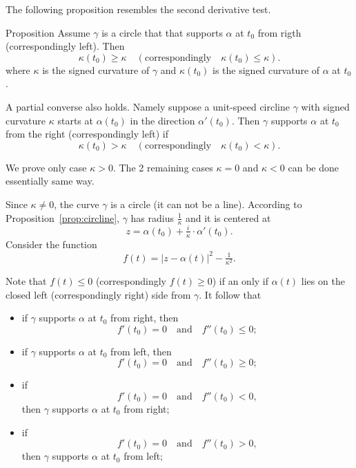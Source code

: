The following proposition resembles the second derivative test. 

\begin{thm}{Proposition}\label{prop:supporting-circline}
Assume $\gamma$ is a circle that that supports $\alpha$ at $t_0$ from rigth (correspondingly left).  
Then 
\[\kappa(t_0)\ge \kappa
\quad(\text{correspondingly}\quad\kappa(t_0)\le \kappa).
\] 
where $\kappa$ is the signed curvature of $\gamma$ 
and $\kappa(t_0)$ is the signed curvature of $\alpha$ at $t_0$.

A partial converse also holds.
Namely suppose a unit-speed circline $\gamma$ with signed curvature $\kappa$ starts at $\alpha(t_0)$ in the direction $\alpha'(t_0)$.
Then $\gamma$ supports $\alpha$ at $t_0$ from the right (correspondingly left) if 
\[\kappa(t_0)> \kappa
\quad(\text{correspondingly}\quad\kappa(t_0)< \kappa).
\]

\end{thm}

We prove only case $\kappa>0$.
The 2 remaining cases $\kappa=0$ and $\kappa<0$ can be done essentially same way.

Since $\kappa\ne0$, the curve $\gamma$ is a circle (it can not be a line).
According to Proposition~\ref{prop:circline},
$\gamma$ has radius $\tfrac1\kappa$ and it is centered at 
\[z=\alpha(t_0)+\tfrac i\kappa\cdot \alpha'(t_0).\]
Consider the function 
\[f(t)=|z-\alpha(t)|^2-\tfrac1{\kappa^2}.\]

Note that $f(t)\le0$ (correspondingly $f(t)\ge0$) 
if an only if $\alpha(t)$ lies on the closed left (correspondingly right) side from $\gamma$.
It follow that 
\begin{itemize}
\item if $\gamma$ supports $\alpha$ at $t_0$ from right, 
then
\[f'(t_0)=0\quad\text{and}\quad f''(t_0)\le 0;\]

\item if $\gamma$ supports $\alpha$ at $t_0$ from  left, 
then 
\[f'(t_0)=0\quad\text{and}\quad f''(t_0)\ge 0;\]

\item if 
\[f'(t_0)=0\quad\text{and}\quad f''(t_0)< 0,\]
then $\gamma$ supports $\alpha$ at $t_0$ from  right;

\item if 
\[f'(t_0)=0\quad\text{and}\quad f''(t_0)> 0,\] then $\gamma$ supports $\alpha$ at $t_0$ from  left;
\end{itemize}


